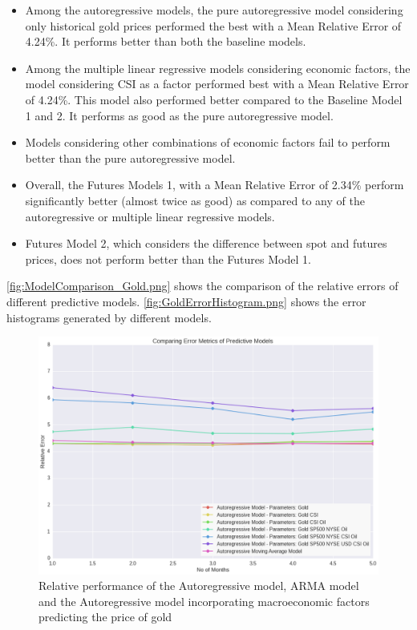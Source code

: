 \documentclass[runningheads]{llncs}
\begin{document}
\begin {itemize}

\item Among the autoregressive models, the pure autoregressive model considering only historical gold prices performed the best with a Mean Relative Error of 4.24\%. It performs better than both the baseline models. \\
\item Among the multiple linear regressive models considering economic factors, the model considering CSI as a factor performed best with a Mean Relative Error of 4.24\%. This model also performed better compared to the Baseline Model 1 and 2. It performs as good as the pure autoregressive model. \\
\item Models considering other combinations of economic factors fail to perform better than the pure autoregressive model.\\
\item Overall, the Futures Models 1, with a Mean Relative Error of 2.34\% perform significantly better (almost twice as good) as compared to any of the autoregressive or multiple linear regressive models. \\
\item Futures Model 2, which considers the difference between spot and futures prices, does not perform better than the Futures Model 1.

\end {itemize}


\autoref{fig:ModelComparison_Gold.png} shows the comparison of the relative errors of different predictive models. \autoref{fig:GoldErrorHistogram.png} shows the error histograms generated by different models.

\begin{figure}
\centering
\includegraphics[width=\textwidth]{ModelComparison_Gold.png}
\caption{Relative performance of the Autoregressive model, ARMA model and the Autoregressive model incorporating macroeconomic factors predicting the price of gold}
\label{fig:ModelComparison_Gold.png}
\end{figure}
\end{document}
